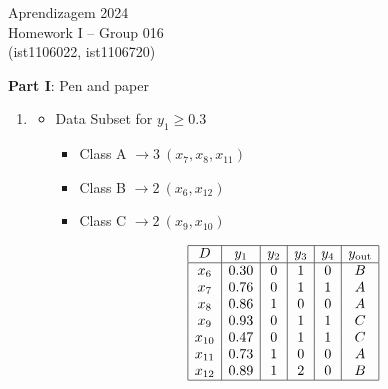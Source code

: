 \documentclass[12pt]{article}
\begin{document}
\center
Aprendizagem 2024\\
Homework I -- Group 016\\
(ist1106022, ist1106720)\vskip 1cm

\large{\textbf{Part I}: Pen and paper}\normalsize

\begin{enumerate}[leftmargin=\labelsep, label=\textbf{\arabic*.)}]
    \item \begin{itemize}
              \item Data Subset for \( y_1 \geq 0.3 \) \\
                    \vspace{0.5em}
                    \begin{minipage}{0.30\textwidth}
                        \begin{itemize}
                            \item Class A $\rightarrow 3 \ (x_7, x_8, x_{11})$
                            \item Class B $\rightarrow 2 \ (x_6, x_{12})$
                            \item Class C $\rightarrow 2 \ (x_9, x_{10})$
                        \end{itemize}
                    \end{minipage}
                    \begin{minipage}{0.45\textwidth}
                        \begin{center}
                            \[\begin{array}{|c|c|c|c|c|c|}
                                    \hline
                                    D      & y_1  & y_2 & y_3 & y_4 & y_{\text{out}} \\
                                    \hline
                                    x_6    & 0.30 & 0   & 1   & 0   & B              \\
                                    x_7    & 0.76 & 0   & 1   & 1   & A              \\
                                    x_8    & 0.86 & 1   & 0   & 0   & A              \\
                                    x_9    & 0.93 & 0   & 1   & 1   & C              \\
                                    x_{10} & 0.47 & 0   & 1   & 1   & C              \\
                                    x_{11} & 0.73 & 1   & 0   & 0   & A              \\
                                    x_{12} & 0.89 & 1   & 2   & 0   & B              \\
                                    \hline
                                \end{array}\]
                        \end{center}
                    \end{minipage}


\end{itemize}
\end{enumerate}
\end{document}
